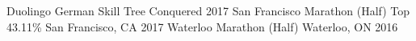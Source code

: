 \begin{cvhonors}
  \cvhonor
    {Duolingo German Skill Tree}
    {Conquered}
    {}
    {2017}
  \cvhonor
    {San Francisco Marathon (Half)}
    {Top 43.11\%}
    {San Francisco, CA}
    {2017}
  \cvhonor
    {Waterloo Marathon (Half)}
    {}
    {Waterloo, ON}
    {2016}
\end{cvhonors}
